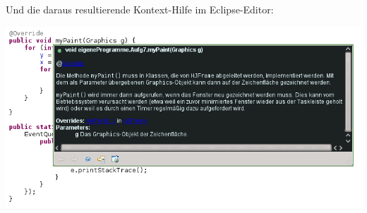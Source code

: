 Und die daraus resultierende Kontext-Hilfe im Eclipse-Editor:

\begin{center}
\includegraphics[width=1.0\textwidth]{./inf/SEKII/30_Java_Javadoc/HJFrame-Javadoc.png}
\end{center}
